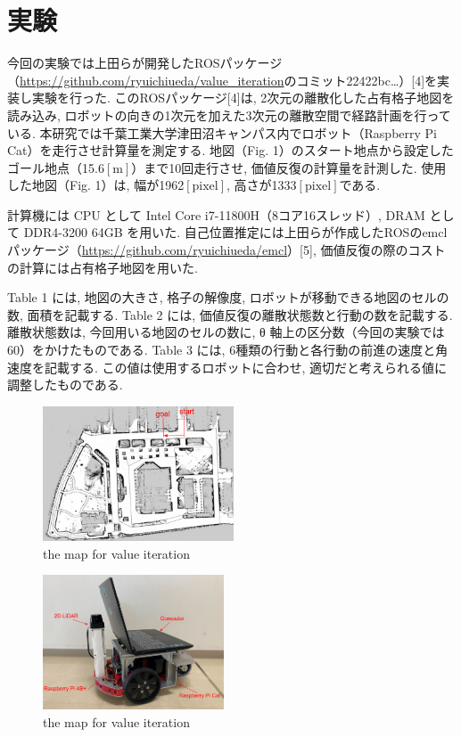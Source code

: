 \documentclass{jarticle}
\begin{document}
\section{実験}%
今回の実験では上田らが開発したROSパッケージ（\href{https://github.com/ryuichiueda/value_iteration}{https://github.com/ryuichiueda/value\_iteration}のコミット22422bc\dots）[4]を実装し実験を行った.
このROSパッケージ[4]は, 2次元の離散化した占有格子地図を読み込み, ロボットの向きの1次元を加えた3次元の離散空間で経路計画を行っている.
本研究では千葉工業大学津田沼キャンパス内でロボット（Raspberry Pi Cat）を走行させ計算量を測定する.
地図（Fig. 1）のスタート地点から設定したゴール地点（15.6$\mathrm{[m]}$）まで10回走行させ, 価値反復の計算量を計測した.
使用した地図（Fig. 1）は, 幅が1962$\mathrm{[pixel]}$, 高さが1333$\mathrm{[pixel]}$である.

計算機には CPU として Intel Core i7-11800H（8コア16スレッド）, DRAM として DDR4-3200 64GB を用いた.
自己位置推定には上田らが作成したROSのemclパッケージ（\href{https://github.com/ryuichiueda/emcl}{https://github.com/ryuichiueda/emcl}）[5], 価値反復の際のコストの計算には占有格子地図を用いた.

Table 1 には, 地図の大きさ, 格子の解像度, ロボットが移動できる地図のセルの数, 面積を記載する.
Table 2 には, 価値反復の離散状態数と行動の数を記載する.
離散状態数は, 今回用いる地図のセルの数に, θ 軸上の区分数（今回の実験では60）をかけたものである.
Table 3 には, 6種類の行動と各行動の前進の速度と角速度を記載する.
この値は使用するロボットに合わせ, 適切だと考えられる値に調整したものである.

\begin{figure}[h!]
  \centering
   \includegraphics[height=40mm]{./figs/tsudanuma.png}
   \caption{the map for value iteration}
\end{figure}

\begin{figure}[h!]
  \centering
   \includegraphics[height=40mm]{./figs/raspicat.png}
   \caption{the map for value iteration}
\end{figure}
\end{document}
